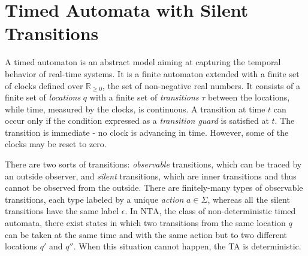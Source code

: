 \documentclass[11pt]{amsart}
\theoremstyle{definition}
\newcommand{\nta}{\mathrm{NTA}}
\newcommand{\Actions}{\Sigma}
\newcommand{\PReals}{\mathbb{R}_{\geq 0}}
\begin{document}
\section{Timed Automata with Silent Transitions}
\label{sec:ta}
A timed automaton is an abstract model aiming at capturing the temporal behavior of real-time systems.
It is a finite automaton extended with a finite set of clocks defined over $\PReals$, the set of non-negative real numbers.
It consists of a finite set of \emph{locations} $q$ with a finite set of \emph{transitions} $\tau$ between the locations, while time, measured by the clocks, is continuous.
A transition at time $t$ can occur only if the condition expressed as a \emph{transition guard}
is satisfied at $t$.
The transition is immediate - no clock is advancing in time. However, some of the clocks may be reset to zero.

There are two sorts of transitions: \emph{observable} transitions, which can be traced by an outside observer, and \emph{silent} transitions, which are inner transitions and thus cannot be observed from the outside.
There are finitely-many types of observable transitions, each type labeled by a unique \emph{action} $a \in \Actions$, whereas all the silent transitions have the same label $\epsilon$.
In $\nta$, the class of non-deterministic timed automata, there exist states in which two transitions from the same location $q$ can be taken at the same time and with the same action but to two different locations $q'$ and $q''$.
When this situation cannot happen, the TA is deterministic.
\end{document}
